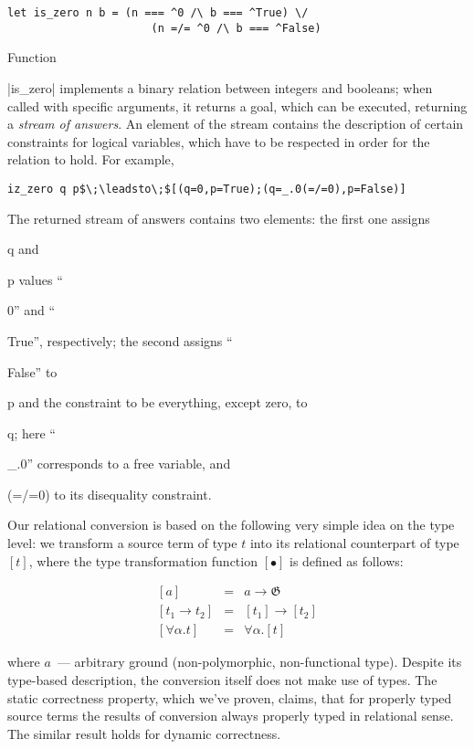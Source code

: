 \documentclass[10pt, oneside, nocopyrightspace]{sigplanconf}
\newcommand{\G}{\mathfrak G}
\newcommand{\miniKanren}{\texttt{miniKanren}\xspace}
\newcommand*{\SavedLstInline}{}
\DeclareRobustCommand*{\lstinline}{%
  \ifmmode
    \let\SavedBGroup\bgroup
    \def\bgroup{%
      \let\bgroup\SavedBGroup
      \hbox\bgroup
    }%
  \fi
  \SavedLstInline
}
\begin{document}
\begin{lstlisting}[basicstyle=\small]
   let is_zero n b = (n === ^0 /\ b === ^True) \/ 
                      (n =/= ^0 /\ b === ^False)
\end{lstlisting}

Function \lstinline|is_zero| implements a binary relation between integers and booleans; when called with specific arguments, it
returns a goal, which can be executed, returning a \emph{stream of answers}. An element of the stream contains the description of 
certain constraints for logical variables, which have to be respected in order for the relation to hold. For example,

\begin{lstlisting}[basicstyle=\small]
   iz_zero q p$\;\leadsto\;$[(q=0,p=True);(q=_.0(=/=0),p=False)]
\end{lstlisting}

The returned stream of answers contains two elements: the first one assigns \lstinline{q} and \lstinline{p} values 
``\lstinline{0}'' and ``\lstinline{True}'', respectively; the second assigns ``\lstinline{False}'' to \lstinline{p} 
and the constraint to be everything, except zero, to \lstinline{q}; here ``\lstinline{_.0}'' corresponds to a free
variable, and \lstinline{(=/=0)} to its disequality constraint.

Our relational conversion is based on the following very simple idea on the type level: we transform a source
term of type $t$ into its relational counterpart of type $[t]$, where the type transformation function $[\bullet]$ 
is defined as follows:

$$
\begin{array}{rcl}
\left[a\right]              &=&a\to\G\\
\left[t_1\to t_2\right]     &=&\left[t_1\right]\to\left[t_2\right]\\
\left[\forall\alpha.t\right]&=&\forall\alpha.\left[t\right]
\end{array}
$$

\noindent where $a$~--- arbitrary ground (non-polymorphic, non-functional type). Despite its type-based description, 
the conversion itself does not make use of types. The static correctness property, which we've proven, claims, that
for properly typed source terms the results of conversion always properly typed in relational sense. The similar
result holds for dynamic correctness.

\end{document}
